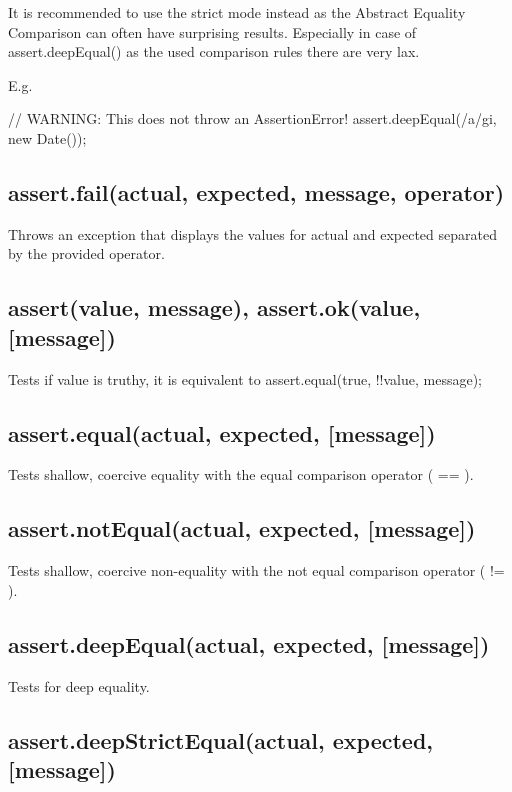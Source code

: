It is recommended to use the {\ttfamily strict mode} instead as the Abstract Equality Comparison can often have surprising results. Especially in case of {\ttfamily assert.\+deep\+Equal()} as the used comparison rules there are very lax.

E.\+g.


\begin{DoxyCode}
// WARNING: This does not throw an AssertionError!
assert.deepEqual(/a/gi, new Date());
\end{DoxyCode}


\subsection*{assert.\+fail(actual, expected, message, operator)}

Throws an exception that displays the values for actual and expected separated by the provided operator.

\subsection*{assert(value, message), assert.\+ok(value, \mbox{[}message\mbox{]})}

Tests if value is truthy, it is equivalent to assert.\+equal(true, !!value, message);

\subsection*{assert.\+equal(actual, expected, \mbox{[}message\mbox{]})}

Tests shallow, coercive equality with the equal comparison operator ( == ).

\subsection*{assert.\+not\+Equal(actual, expected, \mbox{[}message\mbox{]})}

Tests shallow, coercive non-\/equality with the not equal comparison operator ( != ).

\subsection*{assert.\+deep\+Equal(actual, expected, \mbox{[}message\mbox{]})}

Tests for deep equality.

\subsection*{assert.\+deep\+Strict\+Equal(actual, expected, \mbox{[}message\mbox{]})}

